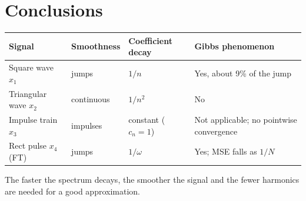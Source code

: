 \documentclass[11pt,a4paper]{article}
\begin{document}
\section*{Conclusions}
\begin{center}
\begin{tabular}{@{}llll@{}}
\toprule
Signal & Smoothness & Coefficient decay & Gibbs phenomenon\\
\midrule
Square wave $x_1$ & jumps & $1/n$ & Yes, about 9\% of the jump\\
Triangular wave $x_2$ & continuous & $1/n^2$ & No\\
Impulse train $x_3$ & impulses & constant ($c_n=1$) & Not applicable; no pointwise convergence\\
Rect pulse $x_4$ (FT) & jumps & $1/\omega$ & Yes; MSE falls as $1/N$\\
\bottomrule
\end{tabular}
\end{center}
The faster the spectrum decays, the smoother the signal and the fewer harmonics are needed for a good approximation.
\end{document}
